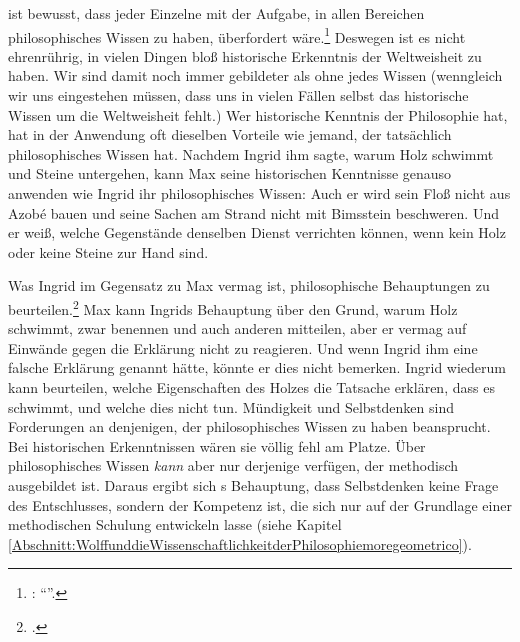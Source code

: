  ist bewusst,
dass jeder Einzelne mit der Aufgabe, in allen Bereichen philosophisches Wissen zu haben, überfordert
wäre.\footnote{\cite[Vgl.][\S~48]{Wolff:Discursuspraeliminarisdephilosophiaingenere1996}:
\enquote{}.} Deswegen ist es nicht ehrenrührig,
in vielen Dingen bloß historische Erkenntnis der Weltweisheit zu haben. Wir sind
damit noch immer gebildeter als ohne jedes Wissen (wenngleich wir uns
eingestehen müssen, dass uns in vielen Fällen selbst das historische Wissen um
die Weltweisheit fehlt.)
Wer historische Kenntnis der Philosophie hat, hat in der Anwendung oft dieselben
Vorteile wie jemand, der tatsächlich philosophisches Wissen hat. Nachdem Ingrid
ihm sagte, warum Holz schwimmt und Steine untergehen, kann Max seine
historischen Kenntnisse genauso anwenden wie Ingrid ihr philosophisches Wissen:
Auch er wird sein Floß nicht aus Azob{\'e} bauen und seine Sachen am Strand
nicht mit Bimsstein beschweren. Und er weiß, welche Gegenstände denselben Dienst
verrichten können, wenn kein Holz oder keine Steine zur Hand sind.

Was Ingrid im Gegensatz zu Max vermag ist, philosophische Behauptungen zu
beurteilen.\footnote{\cite[Vgl.][\S~52]{Wolff:Discursuspraeliminarisdephilosophiaingenere1996}.}
Max kann Ingrids Behauptung über den Grund, warum Holz schwimmt, zwar benennen
und auch anderen mitteilen, aber er vermag auf Einwände gegen die Erklärung
nicht zu reagieren. Und wenn Ingrid ihm eine falsche Erklärung genannt hätte,
könnte er dies nicht bemerken. Ingrid wiederum kann beurteilen, welche
Eigenschaften des Holzes die Tatsache erklären, dass es schwimmt, und welche
dies nicht tun. Mündigkeit und Selbstdenken sind Forderungen an denjenigen, der
philosophisches Wissen zu haben beansprucht. Bei historischen Erkenntnissen
wären sie völlig fehl am Platze. Über philosophisches Wissen \emph{kann} aber
nur derjenige verfügen, der methodisch ausgebildet ist. Daraus ergibt sich
s Behauptung,
dass Selbstdenken keine Frage des Entschlusses, sondern der Kompetenz ist, die
sich nur auf der Grundlage einer methodischen Schulung entwickeln lasse (siehe
Kapitel \ref{Abschnitt:WolffunddieWissenschaftlichkeitderPhilosophiemoregeometrico}).

